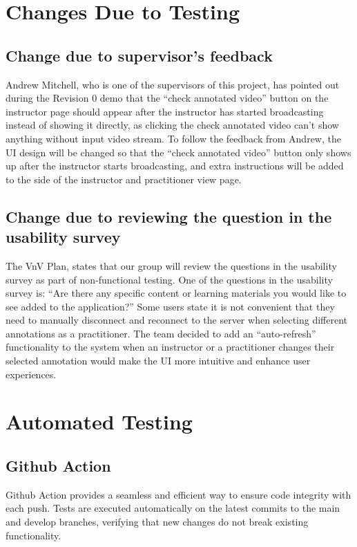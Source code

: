 \documentclass[12pt, titlepage]{article}
\begin{document}
\section{Changes Due to Testing}

\subsection{Change due to supervisor's feedback}
Andrew Mitchell, who is one of the supervisors of this project, has pointed out during the Revision 0 demo that the “check annotated video” button on the instructor page should appear after the instructor has started broadcasting instead of showing it directly, as clicking the check annotated video can’t show anything without input video stream. To follow the feedback from Andrew, the UI design will be changed so that the “check annotated video” button only shows up after the instructor starts broadcasting, and extra instructions will be added to the side of the instructor and practitioner view page.

\subsection{Change due to reviewing the question in the usability survey}
The VnV Plan, states that our group will review the questions in the usability survey as part of non-functional testing. One of the questions in the usability survey is: “Are there any specific content or learning materials you would like to see added to the application?” Some users state it is not convenient that they need to manually disconnect and reconnect to the server when selecting different annotations as a practitioner. The team decided to add an “auto-refresh” functionality to the system when an instructor or a practitioner changes their selected annotation would make the UI more intuitive and enhance user experiences.

\section{Automated Testing}
\subsection{Github Action}
Github Action provides a seamless and efficient way to ensure code integrity with each push. 
Tests are executed automatically on the latest commits to the main and develop branches, verifying that new changes do not break existing functionality. 
\end{document}
